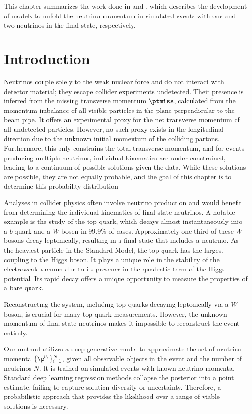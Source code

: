 This chapter summarizes the work done in \textcite{NuFlows1} and \textcite{Nu2Flows}, which describes the development of models to unfold the neutrino momentum in simulated \ttbar events with one and two neutrinos in the final state, respectively.

\section{Introduction}

Neutrinos couple solely to the weak nuclear force and do not interact with detector material; they escape collider experiments undetected.
Their presence is inferred from the missing transverse momentum $\ptmiss$, calculated from the momentum imbalance of all visible particles in the plane perpendicular to the beam pipe.
It offers an experimental proxy for the net transverse momentum of all undetected particles.
However, no such proxy exists in the longitudinal direction due to the unknown initial momentum of the colliding partons.
Furthermore, this only constrains the total transverse momentum, and for events producing multiple neutrinos, individual kinematics are under-constrained, leading to a continuum of possible solutions given the data.
While these solutions are possible, they are not equally probable, and the goal of this chapter is to determine this probability distribution.

Analyses in collider physics often involve neutrino production and would benefit from determining the individual kinematics of final-state neutrinos.
A notable example is the study of the top quark, which decays almost instantaneously into a $b$-quark and a $W$ boson in 99.9\% of cases.
Approximately one-third of these $W$ bosons decay leptonically, resulting in a final state that includes a neutrino.
As the heaviest particle in the Standard Model, the top quark has the largest coupling to the Higgs boson.
It plays a unique role in the stability of the electroweak vacuum due to its presence in the quadratic term of the Higgs potential.
Its rapid decay offers a unique opportunity to measure the properties of a bare quark.

Reconstructing the \ttbar system, including top quarks decaying leptonically via a $W$ boson, is crucial for many top quark measurements.
However, the unknown momentum of final-state neutrinos makes it impossible to reconstruct the event entirely.

Our method utilizes a deep generative model to approximate the set of neutrino momenta $\{\p^{\nu_i}\}_{i=1}^N$, given all observable objects in the event and the number of neutrinos $N$.
It is trained on simulated events with known neutrino momenta.
Standard deep learning regression methods collapse the posterior into a point estimate, failing to capture solution diversity or uncertainty.
Therefore, a probabilistic approach that provides the likelihood over a range of viable solutions is necessary.

